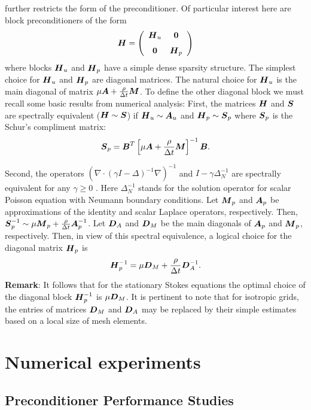 further restricts the form of the preconditioner. Of particular interest here are 
block preconditioners of the form
$$
\mbox{\boldmath $H$} =
\left( \begin{array}{cc}
     \mbox{\boldmath $H$}_u & \mathbf{0}\\[1.5ex]
     \mathbf{0} & \mbox{\boldmath $H$}_p
\end{array} \right)
$$
where blocks $\mbox{\boldmath $H$}_u$ and $\mbox{\boldmath $H$}_p$ have a simple dense sparsity structure.
The simplest choice for $\mbox{\boldmath $H$}_u$ and $\mbox{\boldmath $H$}_p$ are diagonal matrices.  The natural choice
for $\mbox{\boldmath $H$}_u$ is the main diagonal of matrix $\mu \mbox{\boldmath $A$} + \frac{\rho}{\Delta t}\mbox{\boldmath $M$}$. To
define the other diagonal block we must recall some basic results from
numerical analysis: First, the matrices $\mbox{\boldmath $H$}$ and $\mbox{\boldmath $S$}$ are spectrally
equivalent ($\mbox{\boldmath $H$} \sim \mbox{\boldmath $S$}$) if $\mbox{\boldmath $H$}_u \sim \mbox{\boldmath $A$}_u$ and $\mbox{\boldmath $H$}_p \sim \mbox{\boldmath $S$}_p$ 
where $\mbox{\boldmath $S$}_p$ is the Schur's compliment matrix:
$$
\mbox{\boldmath $S$}_p =
\mbox{\boldmath $B$}^T \left[\mu \mbox{\boldmath $A$} + 
              \displaystyle \frac{\rho}{\Delta t} \mbox{\boldmath $M$} 
        \right] ^{-1} 
\mbox{\boldmath $B$}.
$$ 

Second, the operators $\left(\nabla \cdot (\gamma I - \Delta)^{-1}
\nabla\right)^{-1}$ and $I - \gamma \Delta_N^{-1}$ are spectrally equivalent 
for any $\gamma \ge 0$ \cite{DKO97}. Here $\Delta_N^{-1}$ stands for 
the solution operator for scalar Poisson equation with Neumann boundary conditions. 
Let $\mbox{\boldmath $M$}_p$ and $\mbox{\boldmath $A$}_p$ be  approximations of the identity and scalar Laplace 
operators, respectively. Then, $\mbox{\boldmath $S$}_p^{-1} \sim \mu \mbox{\boldmath $M$}_p + \frac{\rho}{\Delta t} \mbox{\boldmath $A$}_p^{-1}$. 
Let $\mbox{\boldmath $D$}_A$ and $\mbox{\boldmath $D$}_M$ be the main diagonals of $\mbox{\boldmath $A$}_p$ and $\mbox{\boldmath $M$}_p$, respectively. 
Then, in view of this spectral equivalence, a logical choice for the diagonal 
matrix $\mbox{\boldmath $H$}_p$ is
\begin{equation}
\label{OptimalHp}
\mbox{\boldmath $H$}_p^{-1} = \mu \mbox{\boldmath $D$}_M + \displaystyle \frac{\rho}{\Delta t} \mbox{\boldmath $D$}_A^{-1}.
\end{equation}
\textbf{Remark}: It follows that for the stationary Stokes equations the optimal choice of
the diagonal block $\mbox{\boldmath $H$}_p^{-1}$ is $\mu \mbox{\boldmath $D$}_M$. It is pertinent to note that for isotropic
grids, the entries of matrices $\mbox{\boldmath $D$}_M$ and $\mbox{\boldmath $D$}_A$ may be replaced by their simple estimates 
based on a local size of mesh elements.


\section{Numerical experiments\label{numerical_experiments}}
\subsection{Preconditioner Performance Studies}

